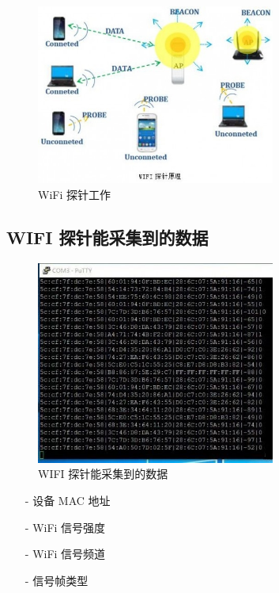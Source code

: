 \begin{figure}[htb]
\centering 
\includegraphics[width=0.70\textwidth]{img/ch1s5m5.jpg} 
\caption{WiFi 探针工作}
\label{Test}
\end{figure}

\subsection{WIFI 探针能采集到的数据}

\begin{figure}[htb]
\centering 
\includegraphics[width=0.70\textwidth]{img/ch1s5m6.jpg} 
\caption{WIFI 探针能采集到的数据}
\label{Test}
\end{figure}

\begin{itemize}
\item [-] 设备 MAC 地址
\item [-] WiFi 信号强度
\item [-] WiFi 信号频道
\item [-] 信号帧类型
\end{itemize}

